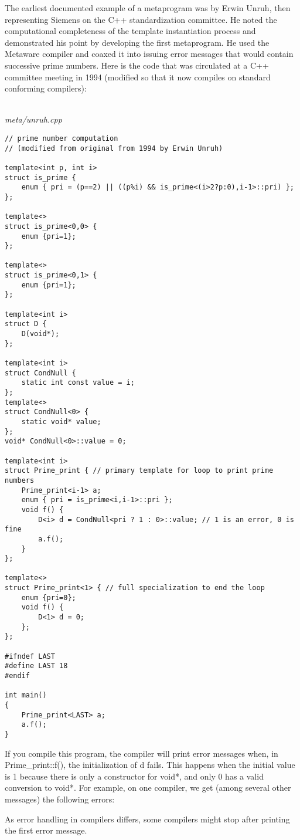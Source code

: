 The earliest documented example of a metaprogram was by Erwin Unruh, then representing Siemens on the C++ standardization committee. He noted the computational completeness of the template instantiation process and demonstrated his point by developing the first metaprogram. He used the Metaware compiler and coaxed it into issuing error messages that would contain successive prime numbers. Here is the code that was circulated at a C++ committee meeting in 1994 (modified so that it now compiles on standard conforming compilers):

\hspace*{\fill} \\ %
\noindent
\textit{meta/unruh.cpp}
\begin{lstlisting}[style=styleCXX]
// prime number computation
// (modified from original from 1994 by Erwin Unruh)

template<int p, int i>
struct is_prime {
	enum { pri = (p==2) || ((p%i) && is_prime<(i>2?p:0),i-1>::pri) };
};

template<>
struct is_prime<0,0> {
	enum {pri=1};
};

template<>
struct is_prime<0,1> {
	enum {pri=1};
};

template<int i>
struct D {
	D(void*);
};

template<int i>
struct CondNull {
	static int const value = i;
};
template<>
struct CondNull<0> {
	static void* value;
};
void* CondNull<0>::value = 0;

template<int i>
struct Prime_print { // primary template for loop to print prime numbers
	Prime_print<i-1> a;
	enum { pri = is_prime<i,i-1>::pri };
	void f() {
		D<i> d = CondNull<pri ? 1 : 0>::value; // 1 is an error, 0 is fine
		a.f();
	}
};

template<>
struct Prime_print<1> { // full specialization to end the loop
	enum {pri=0};
	void f() {
		D<1> d = 0;
	};
};

#ifndef LAST
#define LAST 18
#endif

int main()
{
	Prime_print<LAST> a;
	a.f();
}
\end{lstlisting}

If you compile this program, the compiler will print error messages when, in Prime\_print::f(), the initialization of d fails. This happens when the initial value is 1 because there is only a constructor for void*, and only 0 has a valid conversion to void*. For example, on one compiler, we get (among several other messages) the following errors:

\begin{tcolorbox}[colback=webgreen!5!white,colframe=webgreen!75!black]
\hspace*{0.75cm}As error handling in compilers differs, some compilers might stop after printing the first error message.
\end{tcolorbox}

